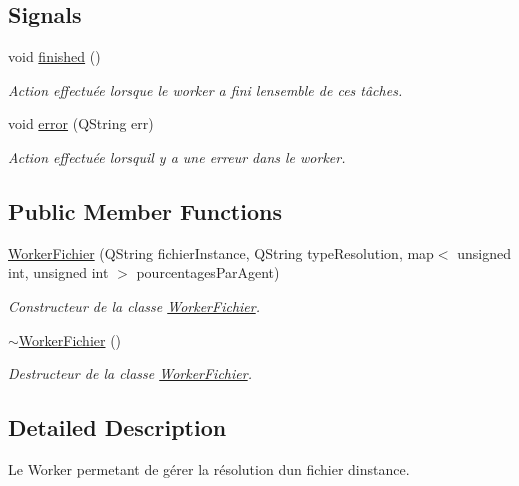 \subsection*{Signals}
\begin{DoxyCompactItemize}
\item 
void \hyperlink{classWorkerFichier_a829c3872070e4cab2d84c11b7c12dccc}{finished} ()
\begin{DoxyCompactList}\small\item\em Action effectuée lorsque le worker a fini l\textquotesingle{}ensemble de ces tâches. \end{DoxyCompactList}\item 
void \hyperlink{classWorkerFichier_ae7f4b3f3ce2a053855a21d05f13e1f4e}{error} (Q\+String err)
\begin{DoxyCompactList}\small\item\em Action effectuée lorsqu\textquotesingle{}il y a une erreur dans le worker. \end{DoxyCompactList}\end{DoxyCompactItemize}
\subsection*{Public Member Functions}
\begin{DoxyCompactItemize}
\item 
\hyperlink{classWorkerFichier_addb7f9e5fa891620d9a048cdd77559c2}{Worker\+Fichier} (Q\+String fichier\+Instance, Q\+String type\+Resolution, map$<$ unsigned int, unsigned int $>$ pourcentages\+Par\+Agent)
\begin{DoxyCompactList}\small\item\em Constructeur de la classe \hyperlink{classWorkerFichier}{Worker\+Fichier}. \end{DoxyCompactList}\item 
\hyperlink{classWorkerFichier_acabdd12b795f6b7f656e0ed9e61cb6ca}{$\sim$\+Worker\+Fichier} ()
\begin{DoxyCompactList}\small\item\em Destructeur de la classe \hyperlink{classWorkerFichier}{Worker\+Fichier}. \end{DoxyCompactList}\end{DoxyCompactItemize}


\subsection{Detailed Description}
Le Worker permetant de gérer la résolution d\textquotesingle{}un fichier d\textquotesingle{}instance. 

